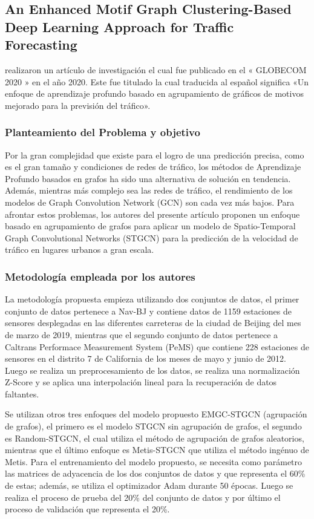 \subsection{An Enhanced Motif Graph Clustering-Based Deep Learning Approach for Traffic Forecasting \citep*{pr_zhang}}
\citeauthor{pr_zhang} realizaron un artículo de investigación el cual fue publicado en el « GLOBECOM 2020 » en el año 2020. Este fue titulado  la cual traducida al español significa «Un enfoque de aprendizaje profundo basado en agrupamiento de gráficos de motivos mejorado para la previsión del tráfico».

\subsubsection{Planteamiento del Problema y objetivo }
Por la gran complejidad que existe para el logro de una predicción precisa, como es el gran tamaño y condiciones de redes de tráfico, los métodos de Aprendizaje Profundo basados en grafos ha sido una alternativa de solución en tendencia. Además, mientras más complejo sea las redes de tráfico, el rendimiento de los modelos de Graph Convolution Network (GCN) son cada vez más bajos. Para afrontar estos problemas, los autores del presente artículo proponen un enfoque basado en agrupamiento de grafos para aplicar un modelo de Spatio-Temporal Graph Convolutional Networks (STGCN) para la predicción de la velocidad de tráfico en lugares urbanos a gran escala.

\subsubsection{Metodología empleada por los autores}
La metodología propuesta empieza utilizando dos conjuntos de datos, el primer conjunto de datos pertenece a Nav-BJ y contiene datos de 1159 estaciones de sensores desplegadas en las diferentes carreteras de la ciudad de Beijing del mes de marzo de 2019, mientras que el segundo conjunto de datos pertenece a Caltrans Performace Measurement System (PeMS) que contiene 228 estaciones de sensores en el distrito 7 de California de los meses de mayo y junio de 2012. Luego se realiza un preprocesamiento de los datos, se realiza una normalización Z-Score y se aplica una interpolación lineal para la recuperación de datos faltantes. 

Se utilizan otros tres enfoques del modelo propuesto EMGC-STGCN (agrupación de grafos), el primero es el modelo STGCN sin agrupación de grafos, el segundo es Random-STGCN, el cual utiliza el método de agrupación de grafos aleatorios, mientras que el último enfoque es Metis-STGCN que utiliza el método ingénuo de Metis. Para el entrenamiento del modelo propuesto, se necesita como parámetro las matrices de adyacencia de los dos conjuntos de datos y que representa el 60\% de estas; además, se utiliza el optimizador Adam durante 50 épocas. Luego se realiza el proceso de prueba del 20\% del conjunto de datos y por último el proceso de validación que representa el 20\%. 

